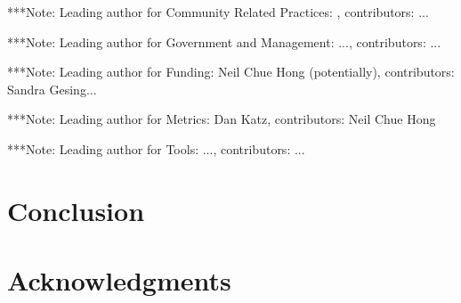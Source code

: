 \documentclass[11pt, oneside]{amsart}
\newcommand{\note}[1]{ {\textcolor{blueish}    { ***Note:      #1 }}}
\begin{document}
\note{Leading author for Community Related Practices: , contributors: ...}


\note{Leading author for Government and Management: ..., contributors: ...}


\note{Leading author for Funding: Neil Chue Hong (potentially), contributors: Sandra Gesing...}


\note{Leading author for Metrics: Dan Katz, contributors: Neil Chue Hong}
 

\note{Leading author for Tools: ..., contributors: ...}


\section{Conclusion} \label{sec:conclusion}

\section*{Acknowledgments} \label{sec:acks}






\end{document}
